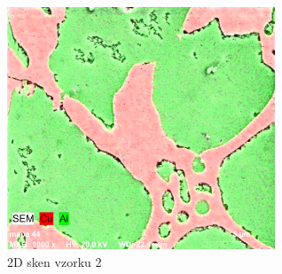 \begin{figure}[htbp]
\centering
\includegraphics[width=8cm]{graficos/vz2_2D.png}
\caption{2D sken vzorku 2}
\label{o:vz2_2D}
\end{figure}
